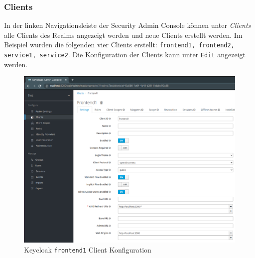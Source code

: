 \subsubsection{Clients}

In der linken Navigationsleiste der Security Admin Console können unter \textit{Clients} alle Clients des Realms angezeigt werden und neue Clients erstellt werden. Im Beispiel wurden die folgenden vier Clients erstellt: \texttt{frontend1, frontend2, service1, service2}. Die Konfiguration der Clients kann unter \texttt{Edit} angezeigt werden.

\begin{figure}[!ht]
	\centering
	\includegraphics[width=1\textwidth]{Images/EbertScherer/KeycloakClientConfig.PNG}
	\caption{Keycloak \texttt{frontend1} Client Konfiguration}
	\label{fig:EB_Keycloak frontend1 Client Konfiguration}
\end{figure}


